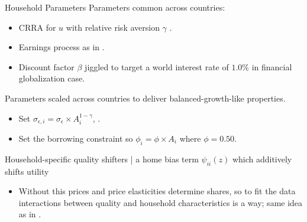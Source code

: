 \documentclass[9pt,pdftex,aspectratio=1610]{beamer}
\theoremstyle{definition}
\begin{document}
\begin{frame}[t]{Household Parameters}
\smallskip
Parameters common across countries:
\begin{itemize}
\smallskip
\item CRRA for $u$ with relative risk aversion $\gamma$ . \\
\smallskip
\item Earnings process as in \citet*{krueger2016macroeconomics}.
\smallskip
\item Discount factor $\beta$ jiggled to target a world interest rate of $1.0 \%$ in financial globalization case.
\end{itemize}
\bigskip
Parameters scaled across countries to deliver balanced-growth-like properties.
\begin{itemize}
\smallskip
\item Set $\sigma_{\epsilon,i} = \sigma_{\epsilon}\times A_i^{1-\gamma}$, .
\medskip
\item Set the borrowing constraint so $\phi_{i} = \phi \times A_i$ where $\phi = 0.50$.
\end{itemize}
\bigskip
Household-specific quality shifters | a home bias term $\psi_{ii}(z)$ which additively shifts utility
\begin{itemize}
\smallskip
\item Without this prices and price elasticities determine shares, so to fit the data interactions between quality and household characteristics is a way; same idea as in \citet{berry1995automobile}.
\smallskip
{}
\end{itemize}
\end{frame}

\end{document}

